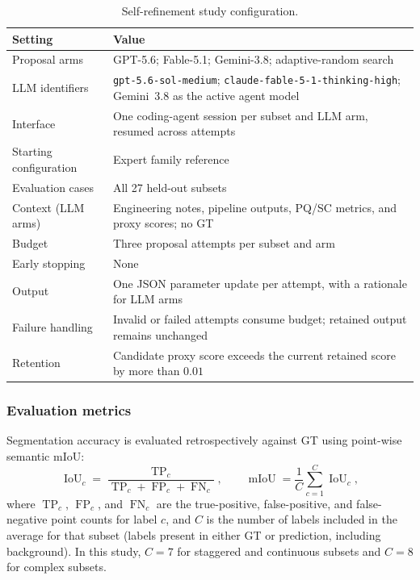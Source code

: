 \documentclass[a4paper,fleqn]{cas-dc}
\begin{document}
\begin{table}[ht]
\caption{Self-refinement study configuration.}
\label{tab:poc-config}
\centering
\begin{tabular}{p{} p{}}
\toprule
Setting & Value \\
\midrule
Proposal arms & GPT-5.6; Fable-5.1; Gemini-3.8; adaptive-random search \\
LLM identifiers & \texttt{gpt-5.6-sol-medium}; \texttt{claude-fable-5-1-thinking-high}; Gemini~3.8 as the active agent model \\
Interface & One coding-agent session per subset and LLM arm, resumed across attempts \\
Starting configuration & Expert family reference \\
Evaluation cases & All 27 held-out subsets \\
Context (LLM arms) & Engineering notes, pipeline outputs, PQ/SC metrics, and proxy scores; no GT \\
Budget & Three proposal attempts per subset and arm \\
Early stopping & None \\
Output & One JSON parameter update per attempt, with a rationale for LLM arms \\
Failure handling & Invalid or failed attempts consume budget; retained output remains unchanged \\
Retention & Candidate proxy score exceeds the current retained score by more than $0.01$ \\
\bottomrule
\end{tabular}
\end{table}


\subsubsection{Evaluation metrics}
\label{sec:metrics}

Segmentation accuracy is evaluated retrospectively against GT using point-wise semantic mIoU:
\begin{equation}
\operatorname{IoU}_c
=
\frac{\operatorname{TP}_c}
{\operatorname{TP}_c+\operatorname{FP}_c+\operatorname{FN}_c},
\qquad
\operatorname{mIoU}
=
\frac{1}{C}\sum_{c=1}^{C}\operatorname{IoU}_c,
\end{equation}
where $\operatorname{TP}_c$, $\operatorname{FP}_c$, and $\operatorname{FN}_c$ are the true-positive, false-positive, and false-negative point counts for label $c$, and $C$ is the number of labels included in the average for that subset (labels present in either GT or prediction, including background). In this study, $C=7$ for staggered and continuous subsets and $C=8$ for complex subsets.
\end{document}
